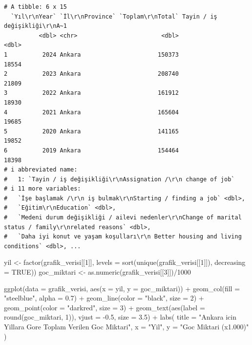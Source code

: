 \documentclass[
  11pt,
  a4paper,
  DIV=11,
  numbers=noendperiod]{scrartcl}
\newenvironment{Shaded}{\begin{snugshade}}{\end{snugshade}}
\newcommand{\AttributeTok}[1]{\textcolor[rgb]{0.40,0.45,0.13}{#1}}
\newcommand{\ConstantTok}[1]{\textcolor[rgb]{0.56,0.35,0.01}{#1}}
\newcommand{\DecValTok}[1]{\textcolor[rgb]{0.68,0.00,0.00}{#1}}
\newcommand{\FloatTok}[1]{\textcolor[rgb]{0.68,0.00,0.00}{#1}}
\newcommand{\FunctionTok}[1]{\textcolor[rgb]{0.28,0.35,0.67}{#1}}
\newcommand{\NormalTok}[1]{\textcolor[rgb]{0.00,0.23,0.31}{#1}}
\newcommand{\OtherTok}[1]{\textcolor[rgb]{0.00,0.23,0.31}{#1}}
\newcommand{\SpecialCharTok}[1]{\textcolor[rgb]{0.37,0.37,0.37}{#1}}
\newcommand{\StringTok}[1]{\textcolor[rgb]{0.13,0.47,0.30}{#1}}
\begin{document}
\begin{verbatim}
# A tibble: 6 x 15
  `Yıl\r\nYear` `İl\r\nProvince` `Toplam\r\nTotal` Tayin / iş değişikliği\r\nA~1
          <dbl> <chr>                        <dbl>                         <dbl>
1          2024 Ankara                      150373                         18554
2          2023 Ankara                      208740                         21809
3          2022 Ankara                      161912                         18930
4          2021 Ankara                      165604                         19685
5          2020 Ankara                      141165                         19852
6          2019 Ankara                      154464                         18398
# i abbreviated name:
#   1: `Tayin / iş değişikliği\r\nAssignation /\r\n change of job`
# i 11 more variables:
#   `İşe başlamak /\r\n iş bulmak\r\nStarting / finding a job` <dbl>,
#   `Eğitim\r\nEducation` <dbl>,
#   `Medeni durum değişikliği / ailevi nedenler\r\nChange of marital status / family\r\nrelated reasons` <dbl>,
#   `Daha iyi konut ve yaşam koşulları\r\n Better housing and living conditions` <dbl>, ...
\end{verbatim}

\begin{Shaded}
\begin{Highlighting}[]
\NormalTok{yil }\OtherTok{\textless{}{-}} \FunctionTok{factor}\NormalTok{(grafik\_verisi[[}\DecValTok{1}\NormalTok{]], }\AttributeTok{levels =} \FunctionTok{sort}\NormalTok{(}\FunctionTok{unique}\NormalTok{(grafik\_verisi[[}\DecValTok{1}\NormalTok{]]), }\AttributeTok{decreasing =} \ConstantTok{TRUE}\NormalTok{))}
\NormalTok{goc\_miktari  }\OtherTok{\textless{}{-}} \FunctionTok{as.numeric}\NormalTok{(grafik\_verisi[[}\DecValTok{3}\NormalTok{]])}\SpecialCharTok{/}\DecValTok{1000}  

\FunctionTok{ggplot}\NormalTok{(}\AttributeTok{data =}\NormalTok{ grafik\_verisi, }\FunctionTok{aes}\NormalTok{(}\AttributeTok{x =}\NormalTok{ yil, }\AttributeTok{y =}\NormalTok{ goc\_miktari)) }\SpecialCharTok{+}
  \FunctionTok{geom\_col}\NormalTok{(}\AttributeTok{fill =} \StringTok{"steelblue"}\NormalTok{, }\AttributeTok{alpha =} \FloatTok{0.7}\NormalTok{) }\SpecialCharTok{+} 
  \FunctionTok{geom\_line}\NormalTok{(}\AttributeTok{color =} \StringTok{"black"}\NormalTok{, }\AttributeTok{size =} \DecValTok{2}\NormalTok{) }\SpecialCharTok{+} 
  \FunctionTok{geom\_point}\NormalTok{(}\AttributeTok{color =} \StringTok{"darkred"}\NormalTok{, }\AttributeTok{size =} \DecValTok{3}\NormalTok{) }\SpecialCharTok{+}
  \FunctionTok{geom\_text}\NormalTok{(}\FunctionTok{aes}\NormalTok{(}\AttributeTok{label =} \FunctionTok{round}\NormalTok{(goc\_miktari, }\DecValTok{1}\NormalTok{)), }\AttributeTok{vjust =} \SpecialCharTok{{-}}\FloatTok{0.5}\NormalTok{, }\AttributeTok{size =} \FloatTok{3.5}\NormalTok{) }\SpecialCharTok{+}
  \FunctionTok{labs}\NormalTok{(}
    \AttributeTok{title =} \StringTok{"Ankara icin Yillara Gore Toplam Verilen Goc Miktari"}\NormalTok{,}
    \AttributeTok{x =} \StringTok{"Yil"}\NormalTok{,}
    \AttributeTok{y =} \StringTok{"Goc Miktari (x1.000)"}
\NormalTok{  )}
\end{Highlighting}
\end{Shaded}
\end{document}
